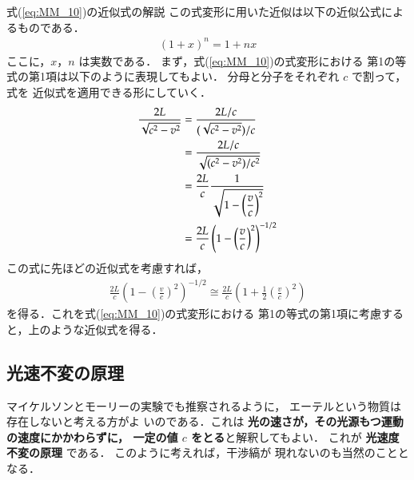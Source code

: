                 \begin{memo}{式(\ref{eq:MM_10})の近似式の解説}
                    この式変形に用いた近似は以下の近似公式によるものである．
                        \begin{align}
                            (1+x)^{n}=1+nx
                        \end{align}
                    ここに，$x$，$n$ は実数である．
                    まず，式(\ref{eq:MM_10})の式変形における
                    第1の等式の第1項は以下のように表現してもよい．
                    分母と分子をそれぞれ $c$ で割って，式を
                    近似式を適用できる形にしていく．
                        \begin{align*}
                            \frac{2L}{\sqrt{c^{2}-v^{2}}}
                            &=\frac{2L/c}{(\sqrt{c^{2}-v^{2}})/c} \notag \\
                            &=\frac{2L/c}{\sqrt{(c^{2}-v^{2})/c^{2}}} \notag \\
                            &=\frac{2L}{c}\frac{1}{\sqrt{1-\displaystyle\left(\frac{v}{c}\right) ^{2}}} \notag \\
                            &=\frac{2L}{c}\left( 1-\displaystyle\left(\frac{v}{c}\right)^{2} \right)^{-1/2}
                        \end{align*}
                    この式に先ほどの近似式を考慮すれば，
                        \begin{align*}
                            \frac{2L}{c}\left( 1-\displaystyle\left(\frac{v}{c}\right)^{2} \right)^{-1/2}\cong
                            \frac{2L}{c}\left( 1+\displaystyle\frac{1}{2}
                            \displaystyle\left(\frac{v}{c}\right)^{2} \right)
                        \end{align*}
                    を得る．これを式(\ref{eq:MM_10})の式変形における
                    第1の等式の第1項に考慮すると，上のような近似式を得る．
                \end{memo}


        \subsection{光速不変の原理}
            マイケルソンとモーリーの実験でも推察されるように，
            エーテルという物質は存在しないと考える方がよ
            いのである．これは \textbf{光の速さが，その光源もつ運動の速度にかかわらずに，
            一定の値 $c$ をとる}と解釈してもよい．
            これが \textbf{光速度不変の原理} である．
            このように考えれば，干渉縞が
            現れないのも当然のこととなる．

